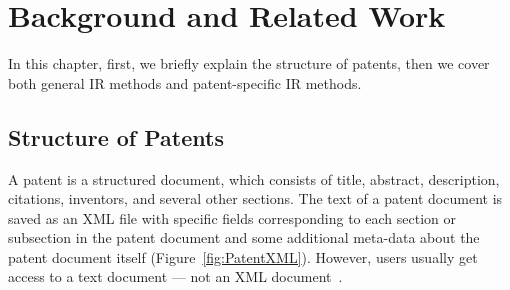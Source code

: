 \chapter{Background and Related Work}
\label{cha:background}
In this chapter, first, we briefly explain the structure of patents, then we cover both general IR methods and patent-specific IR methods.
\section{Structure of Patents}
\label{StructureofPatents}
A patent is a structured document, which consists of 
title, abstract, description, citations, inventors, and several other sections.
The text of a patent document is saved
as an XML file with specific fields corresponding to each
section or subsection in the patent document and some additional meta-data about the patent
document itself (Figure~\ref{fig:PatentXML}). However, users usually get access to a text document --- not an
XML document~\citep{magdy2012toward}.
